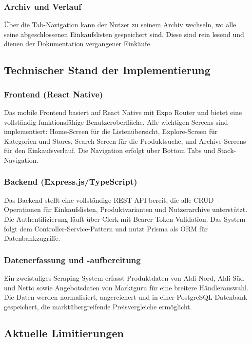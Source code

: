 \subsubsection{Archiv und Verlauf}
Über die Tab-Navigation kann der Nutzer zu seinem Archiv wechseln, wo alle seine abgeschlossenen Einkaufslisten gespeichert sind. Diese sind rein lesend und dienen der Dokumentation vergangener Einkäufe.

\subsection{Technischer Stand der Implementierung}

\subsubsection{Frontend (React Native)}
Das mobile Frontend basiert auf React Native mit Expo Router und bietet eine vollständig funktionsfähige Benutzeroberfläche. Alle wichtigen Screens sind implementiert: Home-Screen für die Listenübersicht, Explore-Screen für Kategorien und Stores, Search-Screen für die Produktsuche, und Archive-Screens für den Einkaufsverlauf. Die Navigation erfolgt über Bottom Tabs und Stack-Navigation.

\subsubsection{Backend (Express.js/TypeScript)}
Das Backend stellt eine vollständige REST-API bereit, die alle CRUD-Operationen für Einkaufslisten, Produktvarianten und Nutzerarchive unterstützt. Die Authentifizierung läuft über Clerk mit Bearer-Token-Validation. Das System folgt dem Controller-Service-Pattern und nutzt Prisma als ORM für Datenbankzugriffe.

\subsubsection{Datenerfassung und -aufbereitung}
Ein zweistufiges Scraping-System erfasst Produktdaten von Aldi Nord, Aldi Süd und Netto sowie Angebotsdaten von Marktguru für eine breitere Händlerauswahl. Die Daten werden normalisiert, angereichert und in einer PostgreSQL-Datenbank gespeichert, die marktübergreifende Preisvergleiche ermöglicht.

\subsection{Aktuelle Limitierungen}

